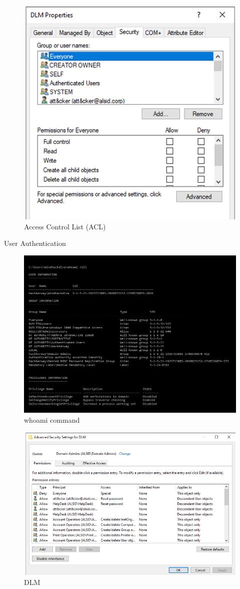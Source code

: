 \begin{figure}
    \centering
    
    \includegraphics[width=0.75\linewidth]{acl.png}
    \caption{Access Control List (ACL)}
    \label{fig:placeholder}
\end{figure}

User Authentication

\begin{figure}
    \centering
    \includegraphics[width=0.75\linewidth]{whoamicmd.png}
    \caption{whoami command}
\end{figure}

\begin{figure}
    \centering
    \includegraphics[width=0.75\linewidth]{dlm.png}
    \caption{DLM}
    \label{fig:placeholder}
\end{figure}

